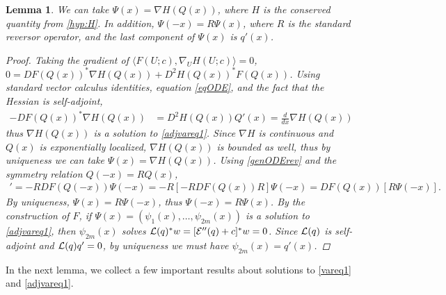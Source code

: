 \documentclass[10pt,reqno]{amsart}
\theoremstyle{plain}
\newtheorem{lemma}[theorem]{Lemma}
\theoremstyle{definition}
\theoremstyle{remark}
\numberwithin{theorem}{section}
\numberwithin{equation}{section}
\begin{document}
\begin{lemma}\label{psiform}
We can take $\Psi(x) = \nabla H(Q(x))$, where $H$ is the conserved quantity from \cref{hyp:H}. In addition, $\Psi(-x) = R \Psi(x)$, where $R$ is the standard reversor operator, and the last component of $\Psi(x)$ is $q'(x)$.
\begin{proof}
Taking the gradient of $\langle F(U; c), \nabla_U H(U; c) \rangle = 0$, $0 = D F(Q(x))^* \nabla H(Q(x)) + D^2 H(Q(x))^* F(Q(x))$. Using standard vector calculus identities, equation \cref{eqODE}, and the fact that the Hessian is self-adjoint,
\begin{align*}
-D F(Q(x))^* \nabla H(Q(x)) &= D^2 H(Q(x)) Q'(x) = \frac{d}{dx} \nabla H(Q(x))
\end{align*}
thus $\nabla H(Q(x))$ is a solution to \eqref{adjvareq1}. Since $\nabla H$ is continuous and $Q(x)$ is exponentially localized, $\nabla H(Q(x))$ is bounded as well, thus by uniqueness we can take $\Psi(x) = \nabla H(Q(x))$. Using \eqref{genODErev} and the symmetry relation $Q(-x) = R Q(x)$, 
\begin{align*}
[R \Psi(-x)]' = -R DF(Q(-x)) \Psi(-x) 
= -R [-RDF(Q(x))R] \Psi(-x) = DF(Q(x))[ R \Psi(-x) ].
\end{align*}
By uniqueness, $\Psi(x) = R \Psi(-x)$, thus $\Psi(-x) = R \Psi(x)$. By the construction of $F$, if $\Psi(x) = (\psi_1(x), \dots, \psi_{2m}(x))$ is a solution to \cref{adjvareq1}, then $\psi_{2m}(x)$ solves $\mathcal{L}(q)^* w = [\mathcal{E}''(q) + c]^* w = 0$. Since $\mathcal{L}(q)$ is self-adjoint and $\mathcal{L}(q)q' = 0$, by uniqueness we must have $\psi_{2m}(x) = q'(x)$.
\end{proof}
\end{lemma}

In the next lemma, we collect a few important results about solutions to \cref{vareq1} and \cref{adjvareq1}.
\end{document}
